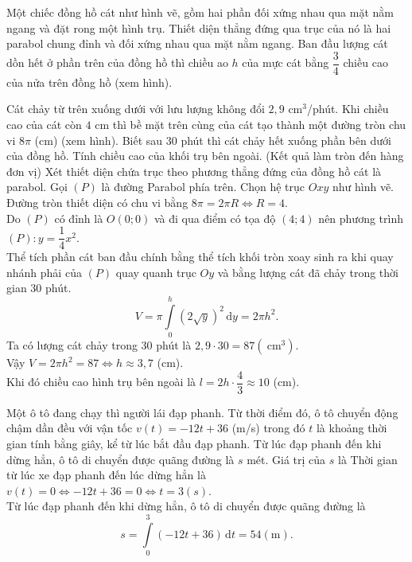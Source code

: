 \begin{ex}%
	Một chiếc đồng hồ cát như hình vẽ, gồm hai phần đối xứng nhau qua mặt nằm ngang và đặt rong một hình trụ. Thiết diện thẳng đứng qua trục của nó là hai parabol chung đỉnh và đối xứng nhau qua mặt nằm ngang. Ban đầu lượng cát dồn hết ở phần trên của đồng hồ thì chiều ao $h$ của mực cát bằng $\dfrac{3}{4}$ chiều cao của nửa trên đồng hồ (xem hình).
	
	
	
	
	Cát chảy từ trên xuống dưới với lưu lượng không đổi $2{,}9$ cm$^3$/phút. Khi chiều cao của cát còn $4$ cm thì bề mặt trên cùng của cát tạo thành một đường tròn chu vi $8 \pi$ (cm) (xem hình). Biết sau $30$ phút thì cát chảy hết xuống phần bên dưới của đồng hồ. Tính chiều cao của khối trụ bên ngoài. (Kết quả làm tròn đến hàng đơn vị)
	\shortans{}
	\loigiai
	{Xét thiết diện chứa trục theo phương thẳng đứng của đồng hồ cát là parabol. Gọi $(P)$ là đường Parabol phía trên. Chọn hệ trục $O x y$ như hình vẽ.\\
		Đường tròn thiết diện có chu vi bằng $8 \pi=2 \pi R \Leftrightarrow R=4$.\\
		Do $(P)$ có đỉnh là $O(0 ; 0)$ và đi qua điểm có tọa độ $(4 ; 4)$ nên phương trình $(P)\colon y=\dfrac{1}{4} x^2$.\\
		Thể tích phần cát ban đầu chính bằng thể tích khối tròn xoay sinh ra khi quay nhánh phải của $(P)$ quay quanh trục $O y$ và bằng lượng cát đã chảy trong thời gian $30$ phút.		
		$$
		V=\pi \displaystyle\int\limits_0^h(2 \sqrt{y})^2 \mathrm{\,d} y=2 \pi h^2.		$$
		Ta có lượng cát chảy trong 30 phút là $2{,}9\cdot30=87\left(\mathrm{~cm}^3\right)$.\\
		Vậy $V=2 \pi h^2=87 \Leftrightarrow h \approx 3{,}7$ (cm).\\
		Khi đó chiều cao hình trụ bên ngoài là $l=2 h \cdot \dfrac{4}{3} \approx 10$ (cm).
	}
\end{ex}

\begin{ex}%
	Một ô tô đang chạy thì người lái đạp phanh. Từ thời điểm đó, ô tô chuyển động chậm dần đều với vận tốc $v(t)=-12 t+36$ (m/s) trong đó $t$ là khoảng thời gian tính bằng giây, kể từ lúc bắt đầu đạp phanh. Từ lúc đạp phanh đến khi dừng hẳn, ô tô di chuyển được quãng đường là $s$ mét. Giá trị của $s$ là
	\loigiai
	{Thời gian từ lúc xe đạp phanh đến lúc dừng hẳn là $v(t)=0 \Leftrightarrow-12 t+36=0 \Leftrightarrow t=3(s)$.\\
		Từ lúc đạp phanh đến khi dừng hẳn, ô tô di chuyển được quãng đường là $$s=\displaystyle\int\limits_0^3(-12 t+36) \mathrm{\,d}t=54 (\text{m}).$$
	}
\end{ex}

